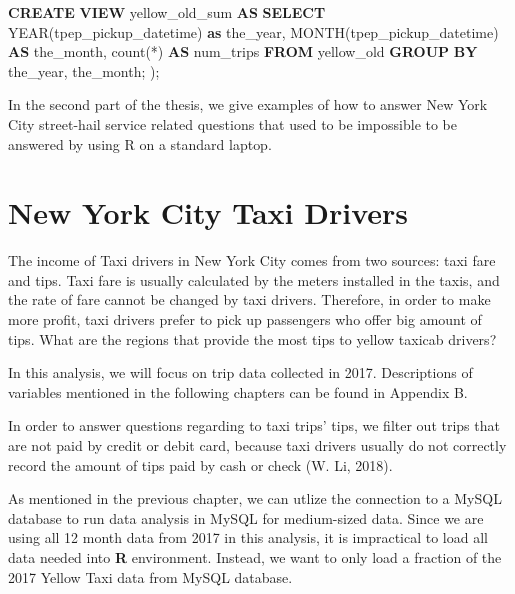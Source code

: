\documentclass[12pt,twoside]{reedthesis}
\newenvironment{Shaded}{\begin{snugshade}}{\end{snugshade}}
\newcommand{\KeywordTok}[1]{\textcolor[rgb]{0.13,0.29,0.53}{\textbf{#1}}}
\newcommand{\DataTypeTok}[1]{\textcolor[rgb]{0.13,0.29,0.53}{#1}}
\newcommand{\FunctionTok}[1]{\textcolor[rgb]{0.00,0.00,0.00}{#1}}
\newcommand{\NormalTok}[1]{#1}
\theoremstyle{definition}
\theoremstyle{definition}
\theoremstyle{definition}
\theoremstyle{remark}
\begin{document}
\begin{Shaded}
\begin{Highlighting}[]
\KeywordTok{CREATE} \KeywordTok{VIEW}\NormalTok{ yellow_old_sum }\KeywordTok{AS} 
\KeywordTok{SELECT} \DataTypeTok{YEAR}\NormalTok{(tpep_pickup_datetime) }\KeywordTok{as}\NormalTok{ the_year, }\DataTypeTok{MONTH}\NormalTok{(tpep_pickup_datetime) }\KeywordTok{AS}\NormalTok{ the_month, }\FunctionTok{count}\NormalTok{(*) }\KeywordTok{AS}\NormalTok{ num_trips}
  \KeywordTok{FROM}\NormalTok{ yellow_old}
  \KeywordTok{GROUP} \KeywordTok{BY}\NormalTok{ the_year, the_month; }
\NormalTok{); }
\end{Highlighting}
\end{Shaded}
In the second part of the thesis, we give examples of how to answer New
York City street-hail service related questions that used to be
impossible to be answered by using R on a standard laptop.

\chapter{New York City Taxi Drivers}\label{chapter3}

The income of Taxi drivers in New York City comes from two sources: taxi
fare and tips. Taxi fare is usually calculated by the meters installed
in the taxis, and the rate of fare cannot be changed by taxi drivers.
Therefore, in order to make more profit, taxi drivers prefer to pick up
passengers who offer big amount of tips. What are the regions that
provide the most tips to yellow taxicab drivers?

In this analysis, we will focus on trip data collected in 2017.
Descriptions of variables mentioned in the following chapters can be
found in Appendix B.

In order to answer questions regarding to taxi trips' tips, we filter
out trips that are not paid by credit or debit card, because taxi
drivers usually do not correctly record the amount of tips paid by cash
or check (W. Li, 2018).

As mentioned in the previous chapter, we can utlize the connection to a
MySQL database to run data analysis in MySQL for medium-sized data.
Since we are using all 12 month data from 2017 in this analysis, it is
impractical to load all data needed into \textbf{R} environment.
Instead, we want to only load a fraction of the 2017 Yellow Taxi data
from MySQL database.
\end{document}
